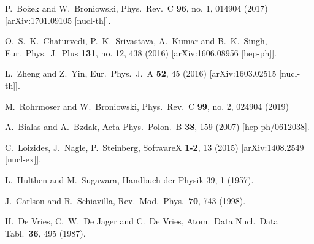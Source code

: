 \documentclass[a4paper,12pt]{article}
\begin{document}
\begin{thebibliography}{9}
 P.~Bożek and W.~Broniowski,
  Phys.\ Rev.\ C {\bf 96}, no. 1, 014904 (2017)
  [arXiv:1701.09105 [nucl-th]].

 O.~S.~K.~Chaturvedi, P.~K.~Srivastava, A.~Kumar and B.~K.~Singh,
  Eur.\ Phys.\ J.\ Plus {\bf 131}, no. 12, 438 (2016)
  [arXiv:1606.08956 [hep-ph]].

 L.~Zheng and Z.~Yin,
  Eur.\ Phys.\ J.\ A {\bf 52}, 45 (2016)
  [arXiv:1603.02515 [nucl-th]].

  M.~Rohrmoser and W.~Broniowski,
  Phys.\ Rev.\ C {\bf 99}, no. 2, 024904 (2019)

  A.~Bialas and A.~Bzdak,
  Acta Phys.\ Polon.\ B {\bf 38}, 159 (2007)
  [hep-ph/0612038].

  C.~Loizides, J.~Nagle, P.~Steinberg,
  SoftwareX {\bf 1-2}, 13 (2015)
  [arXiv:1408.2549 [nucl-ex]].

  L.~Hulthen and M.~Sugawara, Handbuch der Physik 39, 1 (1957).

  J.~Carlson and R.~Schiavilla,
  Rev.\ Mod.\ Phys.\  {\bf 70}, 743 (1998).

  H.~De Vries, C.~W.~De Jager and C.~De Vries,
  Atom.\ Data Nucl.\ Data Tabl.\  {\bf 36}, 495 (1987).


\end{thebibliography}
\end{document}
